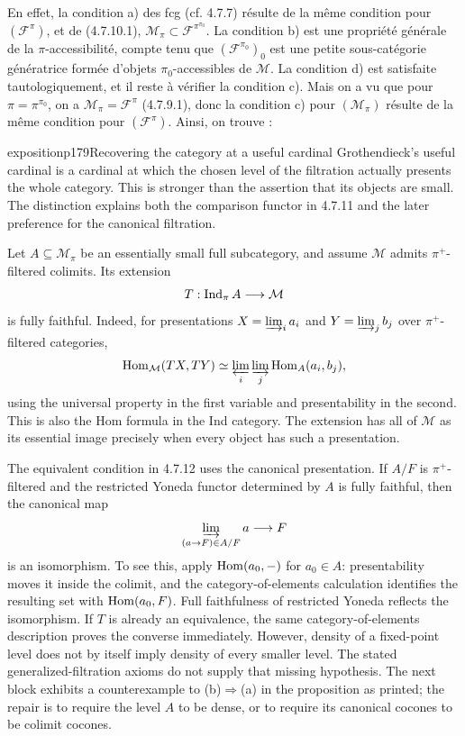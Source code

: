 \noindent{}En effet, la condition a) des fcg (cf. 4.7.7) résulte de la même condition pour $(\mathcal{F}^{\pi})$, et de (4.7.10.1), $\mathcal{M}_\pi\subset\mathcal{F}^{\pi^{\pi_0}}$. La condition b) est une propriété générale de la $\pi$-accessibilité, compte tenu que $(\mathcal{F}^{\pi_0})_0$ est une petite sous-catégorie génératrice formée d'objets $\pi_0$-accessibles de $\mathcal{M}$. La condition d) est satisfaite tautologiquement, et il reste à vérifier la condition c). Mais on a vu que pour $\pi=\pi^{\pi_0}$, on a $\mathcal{M}_\pi=\mathcal{F}^{\pi}$ (4.7.9.1), donc la condition c) pour $(\mathcal{M}_\pi)$ résulte de la même condition pour $(\mathcal{F}^{\pi})$. Ainsi, on trouve :

\begin{dcomment}{exposition}{p179}{Recovering the category at a useful cardinal}
Grothendieck's useful cardinal is a cardinal at which the chosen level of the filtration actually presents the whole category. This is stronger than the assertion that its objects are small. The distinction explains both the comparison functor in 4.7.11 and the later preference for the canonical filtration.

Let $A\subseteq\mathcal M_\pi$ be an essentially small full subcategory, and assume $\mathcal M$ admits $\pi^+$-filtered colimits. Its extension
\[
 T:\operatorname{Ind}_\pi A\longrightarrow\mathcal M
\]
is fully faithful. Indeed, for presentations $X=\varinjlim_i a_i$ and $Y=\varinjlim_j b_j$ over $\pi^+$-filtered categories,
\[
 \operatorname{Hom}_{\mathcal M}(TX,TY)
 \simeq \varprojlim_i\varinjlim_j\operatorname{Hom}_A(a_i,b_j),
\]
using the universal property in the first variable and presentability in the second. This is also the Hom formula in the Ind category. The extension has all of $\mathcal M$ as its essential image precisely when every object has such a presentation.

The equivalent condition in 4.7.12 uses the canonical presentation. If $A/F$ is $\pi^+$-filtered and the restricted Yoneda functor determined by $A$ is fully faithful, then the canonical map
\[
 \varinjlim_{(a\to F)\in A/F}a\longrightarrow F
\]
is an isomorphism. To see this, apply $\operatorname{Hom}(a_0,-)$ for $a_0\in A$: presentability moves it inside the colimit, and the category-of-elements calculation identifies the resulting set with $\operatorname{Hom}(a_0,F)$. Full faithfulness of restricted Yoneda reflects the isomorphism. If $T$ is already an equivalence, the same category-of-elements description proves the converse immediately. However, density of a fixed-point level does not by itself imply density of every smaller level. The stated generalized-filtration axioms do not supply that missing hypothesis. The next block exhibits a counterexample to (b)$\Rightarrow$(a) in the proposition as printed; the repair is to require the level $A$ to be dense, or to require its canonical cocones to be colimit cocones.


\end{dcomment}
